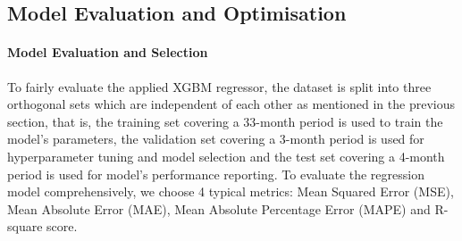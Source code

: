 \documentclass[11pt]{article}
\begin{document}
    \subsection{Model Evaluation and Optimisation}
    
    \paragraph{Model Evaluation and Selection}
    To fairly evaluate the applied XGBM regressor, the dataset is split into three orthogonal sets which are independent of each other as mentioned in the previous section, that is, the training set covering a 33-month period is used to train the model’s parameters, the validation set covering a 3-month period is used for hyperparameter tuning and model selection and the test set covering a 4-month period is used for model’s performance reporting. To evaluate the regression model comprehensively, we choose 4 typical metrics: Mean Squared Error (MSE), Mean Absolute Error (MAE), Mean Absolute Percentage Error (MAPE) and R-square score. 
    
    
    
    
    
\end{document}

